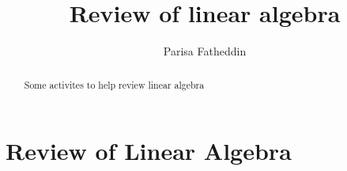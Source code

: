 \documentclass{xourse}
\author{Parisa Fatheddin}
\title{Review of linear algebra}
\begin{document}
\begin{abstract}
    Some activites to help review linear algebra
\end{abstract}
\maketitle

\part{Review of Linear Algebra}

\end{document}
